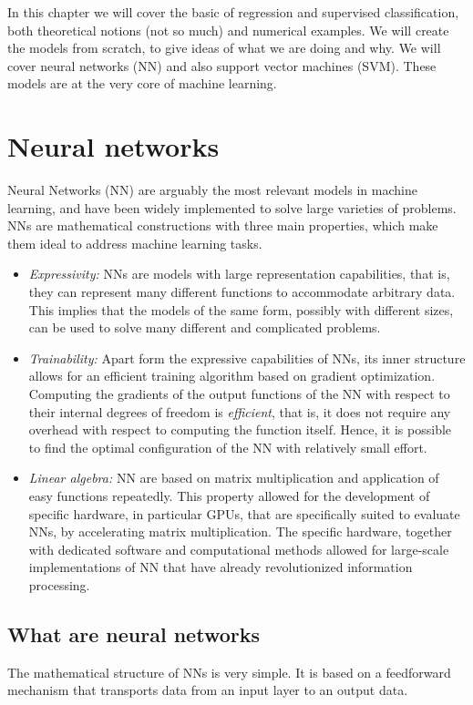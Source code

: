 \documentclass[]{report}
\begin{document}
In this chapter we will cover the basic of regression and supervised classification, both theoretical notions (not so much) and numerical examples. We will create the models from scratch, to give ideas of what we are doing and why. We will cover neural networks (NN) and also support vector machines (SVM). These models are at the very core of machine learning. 

\section{Neural networks}\label{sec.neural-networks}

Neural Networks (NN) are arguably the most relevant models in machine learning, and have been widely implemented to solve large varieties of problems. NNs are mathematical constructions with three main properties, which make them ideal to address machine learning tasks.

\begin{itemize}
\item \textit{Expressivity:} NNs are models with large representation capabilities, that is, they can represent many different functions to accommodate arbitrary data. This implies that the models of the same form, possibly with different sizes, can be used to solve many different and complicated problems. 
\item \textit{Trainability:} Apart form the expressive capabilities of NNs, its inner structure allows for an efficient training algorithm based on gradient optimization. Computing the gradients of the output functions of the NN with respect to their internal degrees of freedom is \textit{efficient}, that is, it does not require any overhead with respect to computing the function itself. Hence, it is possible to find the optimal configuration of the NN with relatively small effort. 
\item \textit{Linear algebra:} NN are based on matrix multiplication and application of easy functions repeatedly. This property allowed for the development of specific hardware, in particular GPUs, that are specifically suited to evaluate NNs, by accelerating matrix multiplication. The specific hardware, together with dedicated software and computational methods allowed for large-scale implementations of NN that have already revolutionized information processing. 
\end{itemize}

\subsection{What are neural networks}\label{sec.what-neural-networks}
The mathematical structure of NNs is very simple. It is based on a feedforward mechanism that transports data from an input layer to an output data. 
\end{document}
